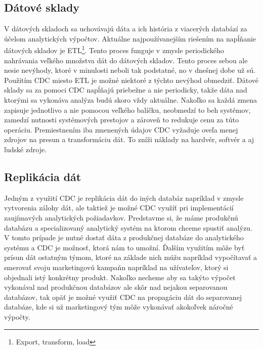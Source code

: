 \subsection{Dátové sklady}
V dátových skladoch sa uchovávajú dáta a ich história z viacerých databází za účelom analytických výpočtov. Aktuálne najpoužívanejším riešením na napĺňanie dátových skladov je ETL\footnote{Export, transform, load}. Tento proces funguje v zmysle periodického nahrávania veľkého množstva dát do dátových skladov. Tento proces sebou ale nesie nevýhody, ktoré v minulosti neboli tak podstatné, no v dnešnej dobe už sú. Použitím CDC miesto ETL je možné niektoré z týchto nevýhod obmedziť. Dátové sklady sa za pomoci CDC napĺňajú priebežne a nie periodicky, takže dáta nad ktorými sa vykonáva analýza budú skoro vždy aktuálne. Nakoľko sa každá zmena zapisuje jednotlivo a nie pomocou veľkého balíčku, neobmedzí to beh systémov, zamedzí nutnosti systémových prestojov a zároveň to redukuje cenu za túto operáciu. Premiestnením iba zmenených údajov CDC vyžaduje oveľa menej zdrojov na presun a transformáciu dát. To zníži náklady na hardvér, softvér a aj ľudské zdroje. \cite{attunity:etl_cdc}

\subsection{Replikácia dát}
Jedným z využití CDC je replikácia dát do iných databáz napríklad v zmysle vytvorenia zálohy dát, ale taktiež je možné CDC využíť pri implementácií zaujímavých analytických požiadavkov. Predstavme si, že máme produkčnú databázu a specializovaný analytický systém na ktorom chceme spustiť analýzu. V tomto prípade je nutné dostať dáta z produkčnej databáze do analytického systému a CDC je možnosť, ktorá nám to umožní. Ďalším využitím môže byť prísun dát ostatným týmom, ktoré na základe nich múžu napríklad vypočítavať a smerovať svoju marketingovú kampaňn napríklad na užívateľov, ktorý si objednali istý konkrétny produkt. Nakoľko necheme aby sa takýto výpočet vykonával nad produkčnou databázov ale skôr nad nejakou separovanou databázov, tak opäť je možné využiť CDC na propagáciu dát do separovanej databáze, kde si už marketingový tým môže vykonávať akokoľvek náročné výpočty.

